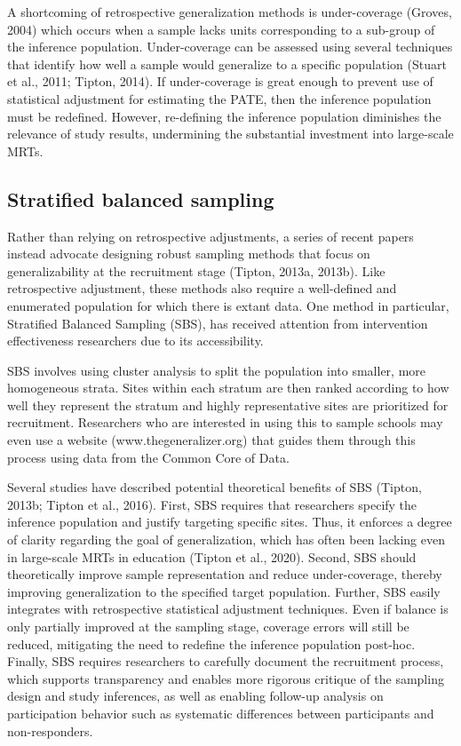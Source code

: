 \documentclass[english,man,floatsintext]{apa6}
\begin{document}
A shortcoming of retrospective generalization methods is under-coverage (Groves, 2004) which occurs when a sample lacks units corresponding to a sub-group of the inference population. Under-coverage can be assessed using several techniques that identify how well a sample would generalize to a specific population (Stuart et al., 2011; Tipton, 2014). If under-coverage is great enough to prevent use of statistical adjustment for estimating the PATE, then the inference population must be redefined. However, re-defining the inference population diminishes the relevance of study results, undermining the substantial investment into large-scale MRTs.

\hypertarget{stratified-balanced-sampling}{%
\subsection{Stratified balanced sampling}\label{stratified-balanced-sampling}}

Rather than relying on retrospective adjustments, a series of recent papers instead advocate designing robust sampling methods that focus on generalizability at the recruitment stage (Tipton, 2013a, 2013b). Like retrospective adjustment, these methods also require a well-defined and enumerated population for which there is extant data.
One method in particular, Stratified Balanced Sampling (SBS), has received attention from intervention effectiveness researchers due to its accessibility.

SBS involves using cluster analysis to split the population into smaller, more homogeneous strata. Sites within each stratum are then ranked according to how well they represent the stratum and highly representative sites are prioritized for recruitment.
Researchers who are interested in using this to sample schools may even use a website (www.thegeneralizer.org) that guides them through this process using data from the Common Core of Data.

Several studies have described potential theoretical benefits of SBS (Tipton, 2013b; Tipton et al., 2016). First, SBS requires that researchers specify the inference population and justify targeting specific sites. Thus, it enforces a degree of clarity regarding the goal of generalization, which has often been lacking even in large-scale MRTs in education (Tipton et al., 2020). Second, SBS should theoretically improve sample representation and reduce under-coverage, thereby improving generalization to the specified target population. Further, SBS easily integrates with retrospective statistical adjustment techniques. Even if balance is only partially improved at the sampling stage, coverage errors will still be reduced, mitigating the need to redefine the inference population post-hoc.
Finally, SBS requires researchers to carefully document the recruitment process, which supports transparency and enables more rigorous critique of the sampling design and study inferences, as well as enabling follow-up analysis on participation behavior such as systematic differences between participants and non-responders.
\end{document}
